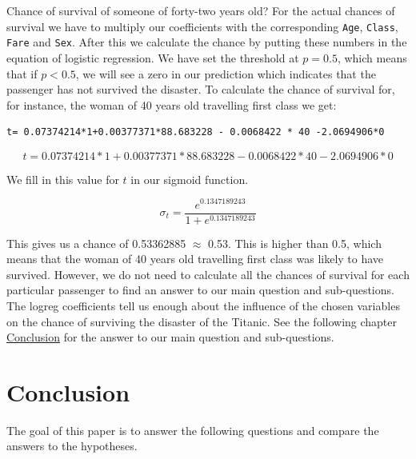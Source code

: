 \documentclass[11pt]{article}
\begin{document}
Chance of survival of someone of forty-two years old? For the actual chances of survival we have to multiply our coefficients with the corresponding \texttt{Age}, \texttt{Class}, \texttt{Fare} and \texttt{Sex}. After this we calculate the chance by putting these numbers in the equation of logistic regression. We have set the threshold at \(p = 0.5\), which means that if \(p < 0.5\),  we will see a zero in our prediction which indicates that the passenger has not survived the disaster. To calculate the chance of survival for, for instance, the woman of 40 years old travelling first class we get: 


\begin{verbatim}
t= 0.07374214*1+0.00377371*88.683228 - 0.0068422 * 40 -2.0694906*0

\end{verbatim}

\begin{equation}
t= 0.07374214*1+0.00377371*88.683228 - 0.0068422 * 40 -2.0694906*0
\end{equation}

We fill in this value for \(t\) in our sigmoid function. 


\begin{equation}
\label{sigmoid}
\sigma_t = \frac{e^{0.1347189243}}{1+e^{0.1347189243}}
\end{equation}

This gives us a chance of 0.53362885 \(\approx\) 0.53. This is higher than 0.5, which means that the woman of 40 years old travelling first class was likely to have survived. However, we do not need to calculate all the chances of survival for each particular passenger to find an answer to our main question and sub-questions. The logreg coefficients tell us enough about the influence of the chosen variables on the chance of surviving the disaster of the Titanic. See the following chapter \hyperref[sec:conclusion]{Conclusion} for the answer to our main question and sub-questions.  





















\newpage
\section{Conclusion}
\label{sec:org34c1153}
\label{sec:conclusion}
The goal of this paper is to answer the following questions and compare the answers to the hypotheses. 
\end{document}
